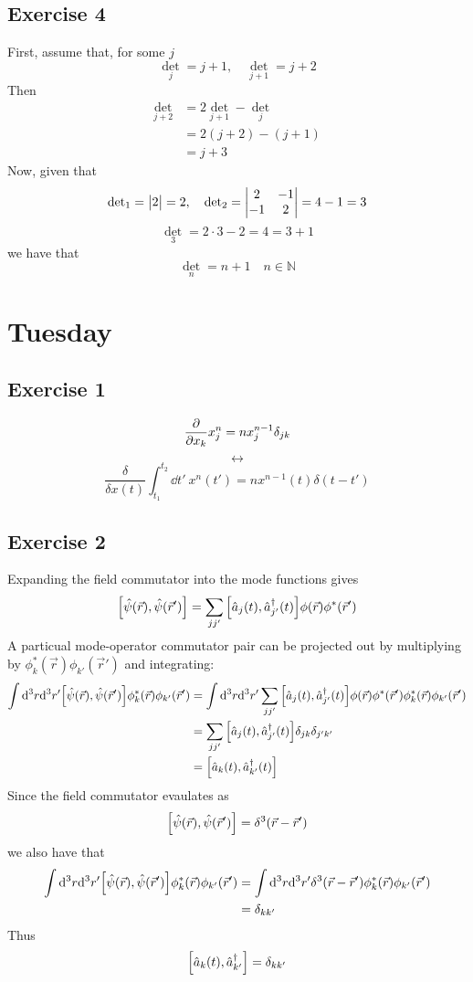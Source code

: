 \documentclass[12pt]{article}
\newcommand{\cint}[2]{\int_{#1}^{#2}}
\newcommand{\cintd}[3]{\cint{#1}{#2}\dd#3\:}
\begin{document}
\subsection*{Exercise 4}
First, assume that, for some $j$
\[ {\det}_j = j+1, \quad {\det}_{j+1} = j+2 \]
Then
\begin{align*}
    {\det}_{j+2} &= 2{\det}_{j+1} - {\det}_j \\
    &= 2(j+2) - (j + 1) \\
    &= j + 3
\end{align*}
Now, given that
\[ {\det}_1 = \mqty|2| = 2, \quad {\det}_2 = \mqty|2&-1\\-1&2| = 4-1 = 3 \]
\[ {\det}_3 = 2\cdot 3 - 2 = 4 = 3+1 \]
we have that 
\[ {\det}_n = n+1 \quad n\in\mathbb{N} \]


\section*{Tuesday}
\subsection*{Exercise 1}
\[ \pdv{x_k}x_j^n = nx_j^{n-1}\delta_{jk} \]
\[ \leftrightarrow \]
\[ \frac{\delta}{\delta x(t)}\cintd{t_1}{t_2}{t'}x^n(t') = nx^{n-1}(t)\delta(t-t') \]

\subsection*{Exercise 2}
Expanding the field commutator into the mode functions gives
\[ \comm{\hat{\psi}(\vec{r})}{\hat{\psi}(\vec{r}')} = \sum_{jj'}\comm{\hat{a}_j(t)}{\hat{a}^\dag_{j'}(t)}\phi(\vec{r})\phi^*(\vec{r}') \]
A particual mode-operator commutator pair can be projected out by multiplying by $\phi_k^*(\vec{r})\phi_{k'}(\vec{r}')$ and integrating:
\begin{align*}
    \int {\dd}^3r{\dd}^3r' \comm{\hat{\psi}(\vec{r})}{\hat{\psi}(\vec{r}')}\phi_k^*(\vec{r})\phi_{k'}(\vec{r}') &= \int {\dd}^3r{\dd}^3r'\sum_{jj'}\comm{\hat{a}_j(t)}{\hat{a}^\dag_{j'}(t)}\phi(\vec{r})\phi^*(\vec{r}')\phi_k^*(\vec{r})\phi_{k'}(\vec{r}') \\
    &= \sum_{jj'}\comm{\hat{a}_j(t)}{\hat{a}^\dag_{j'}(t)}\delta_{jk}\delta_{j'k'} \\
    &= \comm{\hat{a}_k(t)}{\hat{a}^\dag_{k'}(t)}
\end{align*}
Since the field commutator evaulates as
\[ \comm{\hat{\psi}(\vec{r})}{\hat{\psi}(\vec{r}')} = \delta^3(\vec{r}-\vec{r}') \]
we also have that
\begin{align*}
    \int {\dd}^3r{\dd}^3r' \comm{\hat{\psi}(\vec{r})}{\hat{\psi}(\vec{r}')}\phi_k^*(\vec{r})\phi_{k'}(\vec{r}') &= \int {\dd}^3r{\dd}^3r'\delta^3(\vec{r}-\vec{r}')\phi_k^*(\vec{r})\phi_{k'}(\vec{r}') \\
    &= \delta_{kk'}
\end{align*}
Thus
\[ \comm{\hat{a}_k(t)}{\hat{a}_{k'}^\dag} = \delta_{kk'} \]
\end{document}
